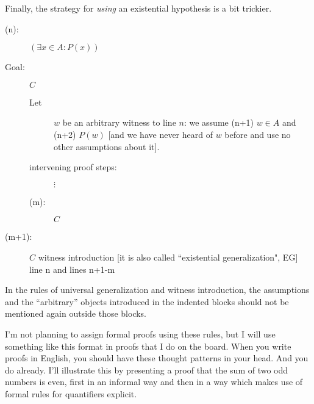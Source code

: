 \documentclass[12pt]{article}
\begin{document}
Finally, the strategy for {\em using\/} an existential hypothesis is a bit trickier.

\begin{description}

\item[(n):]  $(\exists x \in A:P(x))$

\item[Goal:] $C$

\begin{description}
 \item[Let]  $w$ be an arbitrary witness to line $n$:  we assume (n+1) $w \in A$ and (n+2) $P(w)$ [and we have never heard of $w$ before and use no other assumptions about it].

\item[intervening proof steps:]  $\vdots$

\item[(m):]  $C$

\end{description}

\item[(m+1):]  $C$ witness introduction [it is also called ``existential generalization", EG]  line n and lines n+1-m

\end{description}

In the rules of universal generalization and witness introduction, the assumptions and the ``arbitrary'' objects introduced in the indented blocks should not be mentioned again outside those blocks.

I'm not planning to assign formal proofs using these rules, but I will use something like this format in proofs that I do on the board.  When you write proofs in English, you should have these thought patterns in your head.  And you do already.  I'll illustrate this by presenting a  proof that the sum of two odd numbers is even, first in an informal way and then in a way which makes use of formal rules for quantifiers explicit.

\newpage
\end{document}
